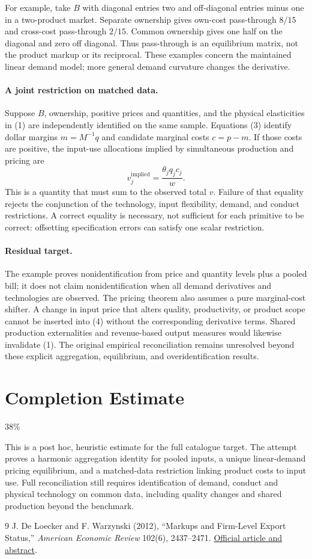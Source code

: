 \documentclass[11pt]{article}
\theoremstyle{definition}
\begin{document}
For example, take $B$ with diagonal entries two and off-diagonal entries minus one in a two-product market. Separate ownership gives own-cost pass-through $8/15$ and cross-cost pass-through $2/15$. Common ownership gives one half on the diagonal and zero off diagonal. Thus pass-through is an equilibrium matrix, not the product markup or its reciprocal. These examples concern the maintained linear demand model; more general demand curvature changes the derivative.

\paragraph{A joint restriction on matched data.}
Suppose $B$, ownership, positive prices and quantities, and the physical elasticities in (1) are independently identified on the same sample. Equations (3) identify dollar margins $m=M^{-1}q$ and candidate marginal costs $c=p-m$. If those costs are positive, the input-use allocations implied by simultaneous production and pricing are
\[
 v_j^{\mathrm{implied}}=\frac{\theta_jq_jc_j}{w}.
\]
This is a quantity that must sum to the observed total $v$. Failure of that equality rejects the conjunction of the technology, input flexibility, demand, and conduct restrictions. A correct equality is necessary, not sufficient for each primitive to be correct: offsetting specification errors can satisfy one scalar restriction.

\paragraph{Residual target.}
The example proves nonidentification from price and quantity levels plus a pooled bill; it does not claim nonidentification when all demand derivatives and technologies are observed. The pricing theorem also assumes a pure marginal-cost shifter. A change in input price that alters quality, productivity, or product scope cannot be inserted into (4) without the corresponding derivative terms. Shared production externalities and revenue-based output measures would likewise invalidate (1). The original empirical reconciliation remains unresolved beyond these explicit aggregation, equilibrium, and overidentification results.

\section{Completion Estimate}
38\%

This is a post hoc, heuristic estimate for the full catalogue target.
The attempt proves a harmonic aggregation identity for pooled inputs, a unique linear-demand pricing equilibrium, and a matched-data restriction linking product costs to input use. Full reconciliation still requires identification of demand, conduct and physical technology on common data, including quality changes and shared production beyond the benchmark.

\begin{thebibliography}{9}
 J. De Loecker and F. Warzynski (2012), ``Markups and Firm-Level Export Status,'' \emph{American Economic Review} 102(6), 2437--2471. \href{https://www.aeaweb.org/articles?id=10.1257/aer.102.6.2437}{Official article and abstract}.
\end{thebibliography}
\end{document}
